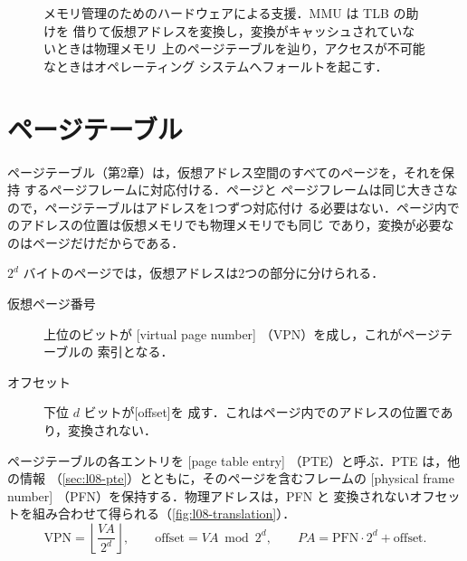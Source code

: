 \documentclass[../main.tex]{subfiles}
\begin{document}
\begin{figure}[htbp]
  \centering
  
  \caption{メモリ管理のためのハードウェアによる支援．MMU は TLB の助けを
    借りて仮想アドレスを変換し，変換がキャッシュされていないときは物理メモリ
    上のページテーブルを辿り，アクセスが不可能なときはオペレーティング
    システムへフォールトを起こす．}
  \label{fig:l08-mmu}
\end{figure}

\section{ページテーブル}
\label{sec:l08-page-tables}

ページテーブル（第2章）は，仮想アドレス空間のすべてのページを，それを保持
するページフレームに対応付ける．ページと
ページフレームは同じ大きさなので，ページテーブルはアドレスを1つずつ対応付け
る必要はない．ページ内でのアドレスの位置は仮想メモリでも物理メモリでも同じ
であり，変換が必要なのはページだけだからである．

$2^{d}$ バイトのページでは，仮想アドレスは2つの部分に分けられる．
\begin{description}
  \item[仮想ページ番号] 上位のビットが
    [virtual page number]%
    （VPN）を成し，これがページテーブルの
    索引となる．
  \item[オフセット] 下位 $d$ ビットが[offset]を
    成す．これはページ内でのアドレスの位置であり，変換されない．
\end{description}
ページテーブルの各エントリを
[page table entry]%
（PTE）と呼ぶ．PTE は，他の情報
（\cref{sec:l08-pte}）とともに，そのページを含むフレームの
[physical frame number]%
（PFN）を保持する．物理アドレスは，PFN と
変換されないオフセットを組み合わせて得られる（\cref{fig:l08-translation}）．
\begin{equation}
  \text{VPN} = \left\lfloor \frac{\mathit{VA}}{2^{d}} \right\rfloor ,
  \qquad
  \text{offset} = \mathit{VA} \bmod 2^{d} ,
  \qquad
  \mathit{PA} = \text{PFN} \cdot 2^{d} + \text{offset} .
  \label{eq:l08-translation}
\end{equation}
\end{document}
